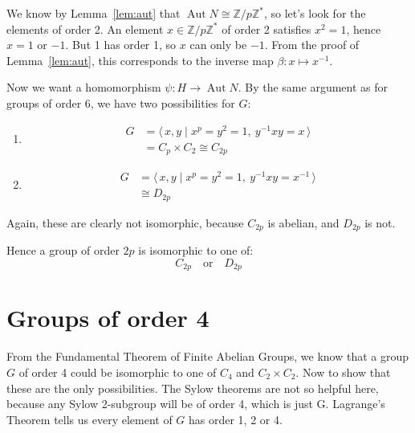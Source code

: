 \documentclass[a4paper, oneside, 12pt, final]{article}
\theoremstyle{definition}
\DeclareMathOperator{\Aut}{Aut}
\newcommand{\Z}{\mathbb{Z}}
\newcommand{\Zn}[1]{\Z/#1\Z}
\begin{document}
We know by Lemma~\ref{lem:aut} that \(\Aut{N} \cong \Zn{p}^*\), so let's look for the elements of
order 2.
An element \(x \in \Zn{p}^*\) of order 2 satisfies \(x^2 = 1\), hence \(x = 1\) or \(-1\).
But 1 has order 1, so \(x\) can only be \(-1\).
From the proof of Lemma~\ref{lem:aut}, this corresponds to the inverse map \(\beta:x \mapsto
x^{-1}\).

Now we want a homomorphism \(\psi: H \to \Aut{N}\).
By the same argument as for groups of order 6, we have two possibilities for \(G\):

\begin{enumerate}
    \item
        \begin{equation*}
        \begin{aligned}
            G &= \langle\, x, y \mid x^p = y^2 = 1,\ y^{-1}xy = x \,\rangle \\
            &= C_p \times C_2 \cong C_{2p}
        \end{aligned}
        \end{equation*}
    \item
        \begin{equation*}
        \begin{aligned}
            G &= \langle\, x, y \mid x^p = y^2 = 1,\ y^{-1}xy = x^{-1}
            \,\rangle \\
            &\cong D_{2p}
        \end{aligned}
        \end{equation*}
\end{enumerate}

Again, these are clearly not isomorphic, because \(C_{2p}\) is abelian, and \(D_{2p}\) is not.

Hence a group of order \(2p\) is isomorphic to one of:
\[C_{2p} \quad \text{or} \quad D_{2p}\]

\section{Groups of order 4}
From the Fundamental Theorem of Finite Abelian Groups, we know that a group \(G\) of order 4 could
be isomorphic to one of \(C_4\) and \(C_2 \times C_2\).
Now to show that these are the only possibilities.
The Sylow theorems are not so helpful here, because any Sylow 2-subgroup will be of order 4, which
is just G.
Lagrange's Theorem tells us every element of \(G\) has order 1, 2 or 4.
\end{document}
